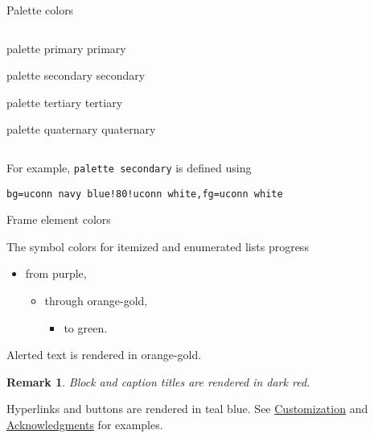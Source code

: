 \documentclass{beamer}
\newtheorem{remark}{Remark}
\begin{document}
\begin{frame}[fragile]{Palette colors}
\begin{columns}
\begin{column}{.5\textwidth}
\begin{beamercolorbox}[sep=4pt,center]{palette primary}
primary
\end{beamercolorbox}

\begin{beamercolorbox}[sep=4pt,center]{palette secondary}
secondary
\end{beamercolorbox}

\begin{beamercolorbox}[sep=4pt,center]{palette tertiary}
tertiary
\end{beamercolorbox}

\begin{beamercolorbox}[sep=4pt,center]{palette quaternary}
quaternary
\end{beamercolorbox}

\end{column}
\end{columns}

\vspace{2ex}
For example, \verb|palette secondary| is defined using
\begin{verbatim}
bg=uconn navy blue!80!uconn white,fg=uconn white
\end{verbatim}

\end{frame}


\begin{frame}{Frame element colors}

The symbol colors for itemized and enumerated lists progress
\begin{itemize}
\item from purple,
\begin{itemize}
\item through orange-gold,
\begin{itemize}
\item to green.
\end{itemize}
\end{itemize}
\end{itemize}
\alert{Alerted text is rendered in orange-gold.}

\vfill\begin{remark}
Block and caption titles are rendered in dark red.
\end{remark}

\vfill
Hyperlinks and buttons are rendered in teal blue.
See \hyperlink{sec:customization}{Customization} and \hyperlink{slide:acknowledgments}{Acknowledgments} for examples.

\end{frame}
\end{document}
